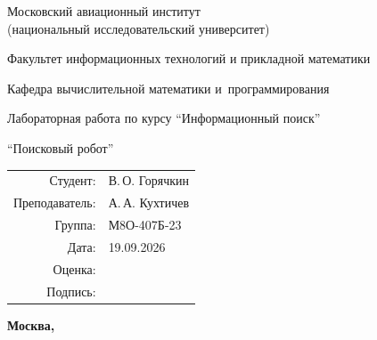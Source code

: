 \begin{titlepage}
\begin{center}
\bfseries

{\Large Московский авиационный институт\\ (национальный исследовательский университет)

}

\vspace{48pt}

{\large Факультет информационных технологий и прикладной математики
}

\vspace{36pt}

{\large Кафедра вычислительной математики и~программирования

}

\vspace{48pt}

Лабораторная работа  по курсу \enquote{Информационный поиск}

\vspace{12pt}

{\large \enquote{Поисковый робот}}

\end{center}

\vspace{72pt}

\begin{flushright}
\begin{tabular}{rl}
Студент: & В.\,О. Горячкин \\
Преподаватель: & А.\,А. Кухтичев \\
Группа: & М8О-407Б-23 \\
Дата: & 19.09.2026 \\
Оценка: & \\
Подпись: & \\
\end{tabular}
\end{flushright}

\vfill

\begin{center}
\bfseries
Москва, \the\year
\end{center}
\end{titlepage}

\pagebreak
